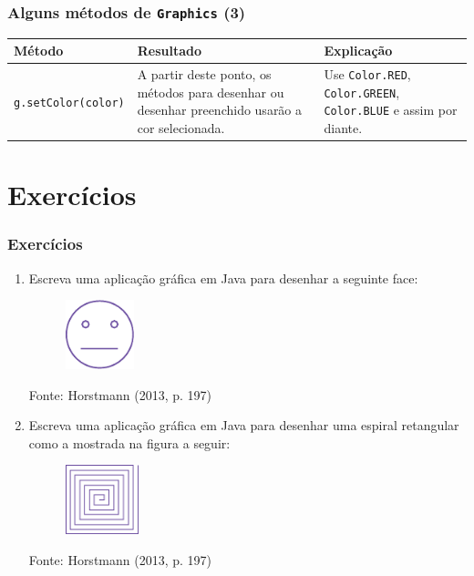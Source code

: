 \documentclass[xcolor={dvipsnames,table},aspectratio=169]{beamer}
\begin{document}
\begin{frame}[fragile]\frametitle{Alguns métodos de \texttt{Graphics} (3)}
{\scriptsize
\begin{center}
  \begin{tabular}{|p{6cm}|p{3cm}|p{4cm}|}
\hline
    \textbf{Método} & \textbf{Resultado} & \textbf{Explicação} \\
\hline
\texttt{g.setColor(color)}
&
A partir deste ponto, os métodos para desenhar ou desenhar preenchido usarão a cor selecionada.
& Use \texttt{Color.RED}, \texttt{Color.GREEN}, \texttt{Color.BLUE} e assim por diante.\\
\hline
  \end{tabular}
\end{center}
}
\end{frame}

\section{Exercícios}

\begin{frame}\frametitle{Exercícios}
\begin{enumerate}

	\item Escreva uma aplicação gráfica em Java para desenhar a seguinte face:
	\begin{figure}[h]
		\includegraphics[height=2cm,center]{pucrs-ep-fprog-unidade_04-graficos_em_java-laminas-exercicio_1.png}
	\end{figure}
	{\tiny Fonte: Horstmann (2013, p. 197)}

	\item Escreva uma aplicação gráfica em Java para desenhar uma espiral retangular como a mostrada na figura a seguir:
	\begin{figure}[h]
		\includegraphics[height=2cm,center]{pucrs-ep-fprog-unidade_04-graficos_em_java-laminas-exercicio_2.png}
	\end{figure}
	{\tiny Fonte: Horstmann (2013, p. 197)}
\end{enumerate}
\end{frame}
\end{document}
